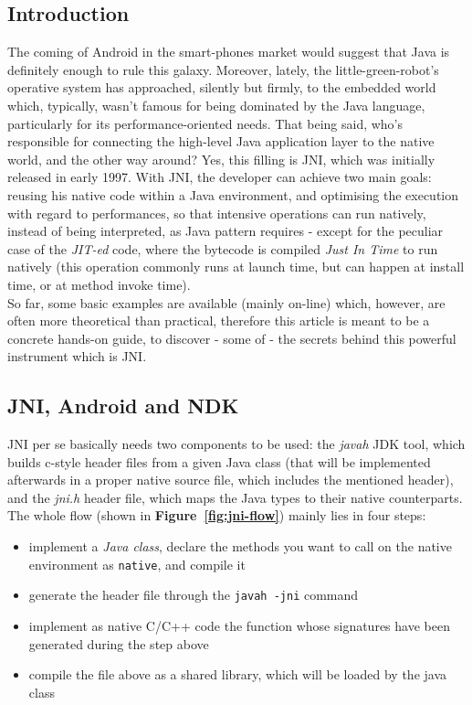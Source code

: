 \documentclass[a4paper,10pt]{article}
\newcommand{\keyword}[1]{\texttt{#1}}
\newcommand{\reff}[1]{\textbf{Figure~\ref{#1}}}
\begin{document}
\vspace{6ex}	%
\begin{multicols}{2}

\section{Introduction}
The coming of Android in the smart-phones market would suggest that Java is
definitely enough to rule this galaxy. Moreover, lately, the
little-green-robot's operative system has approached, silently but firmly, to
the embedded world which, typically, wasn't famous for being dominated by the
Java language, particularly for its performance-oriented needs. That being said,
who's responsible for connecting the high-level Java application layer to the
native world, and the other way around? Yes, this filling is JNI, which was
initially released in early 1997. With JNI, the developer can achieve two main
goals: reusing his native code within a Java environment, and optimising the
execution with regard to performances, so that intensive operations can run
natively, instead of being interpreted, as Java pattern requires - except for
the peculiar case of the \textit{JIT-ed} code, where the bytecode is compiled
\textit{Just In Time} to run natively (this operation commonly runs at launch
time, but can happen at install time, or at method invoke time).\\
So far, some basic examples are available (mainly on-line) which, however, are
often more theoretical than practical, therefore this article is meant to be a
concrete hands-on guide, to discover - some of - the secrets behind this
powerful instrument which is JNI.

\subsection{JNI, Android and NDK}
\label{sec:jni-android-ndk}
JNI per se basically needs two components to be used: the \textit{javah} JDK
tool, which builds c-style header files from a given Java class (that will be
implemented afterwards in a proper native source file, which includes the
mentioned header), and the \textit{jni.h} header file, which maps the Java types
to their native counterparts. The whole flow (shown in \reff{fig:jni-flow})
mainly lies in four steps:
\begin{itemize}
\itemsep 0em
\item implement a \textit{Java class}, declare the methods you want to call
on the native environment as \keyword{native}, and compile it
\item generate the header file through the \keyword{javah -jni} command
\item implement as native C/C++ code the function whose signatures have been
generated during the step above
\item compile the file above as a shared library, which will be loaded by the
java class
\end{itemize}


\end{multicols}
\end{document}
